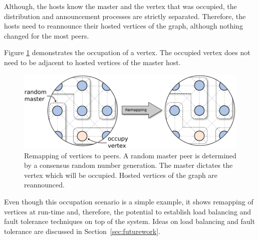 Although, the hosts know the master and the vertex that was occupied,
the distribution and announcement processes are strictly
separated. Therefore, the hosts need to reannounce their hosted
vertices of the graph, although nothing changed for the most peers.

Figure \ref{fig:gol_remapping} demonstrates the occupation of a
vertex.  The occupied vertex does not need to be adjacent to hosted
vertices of the master host.

  \begin{figure}[H]
    \centering
    \includegraphics[width=\textwidth]{graphics/40_gol_remapping}
    \caption{Remapping of vertices to peers. A random master peer is
      determined by a consensus random number generation. The master
      dictates the vertex which will be occupied. Hosted vertices of the
      graph are reannounced.}
    \label{fig:gol_remapping}
  \end{figure}

\noindent Even though this occupation scenario is a simple example, it
shows remapping of vertices at run-time and, therefore, the potential
to establish load balancing and fault tolerance techniques on top of
the system. Ideas on load balancing and fault tolerance are discussed
in Section~\ref{sec:futurework}.

\cleardoublepage

